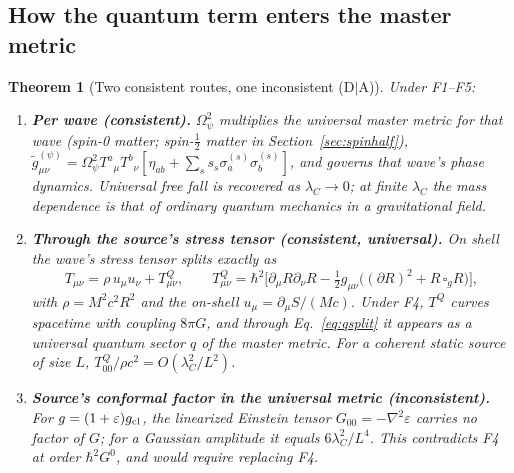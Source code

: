 \documentclass[11pt,a4paper]{article}
\newtheorem{theorem}{Theorem}[section]
\begin{document}
\subsection{How the quantum term enters the master metric}
\begin{theorem}[Two consistent routes, one inconsistent (D$\mid$A)]\label{thm:routes}
Under F1--F5:
\begin{enumerate}
\item \textbf{Per wave (consistent).} $\Omega_\psi^2$ multiplies the universal
master metric for that wave (spin-0 matter; spin-$\frac12$ matter in
Section~\ref{sec:spinhalf}),
$\tilde g^{(\psi)}_{\mu\nu}=\Omega_\psi^2T^a{}_\mu T^b{}_\nu[\eta_{ab}+\sum_ss_s\sigma^{(s)}_a\sigma^{(s)}_b]$,
and governs that wave's phase dynamics. Universal free fall is recovered as
$\lambda_C\to0$; at finite $\lambda_C$ the mass dependence is that of ordinary
quantum mechanics in a gravitational field.
\item \textbf{Through the source's stress tensor (consistent, universal).} On
shell the wave's stress tensor splits exactly as
\begin{equation}\label{eq:TQ}
T_{\mu\nu}=\rho\,u_\mu u_\nu+T^Q_{\mu\nu},\qquad
T^Q_{\mu\nu}=\hbar^2\bigl[\partial_\mu R\partial_\nu R-\tfrac12g_{\mu\nu}\bigl((\partial R)^2+R\,\square_gR\bigr)\bigr],
\end{equation}
with $\rho=M^2c^2R^2$ and the on-shell $u_\mu=\partial_\mu S/(Mc)$. Under F4, $T^Q$
curves spacetime with coupling $8\pi G$, and through Eq.~\eqref{eq:qsplit} it
appears as a universal quantum sector $q$ of the master metric. For a coherent
static source of size $L$, $T^Q_{00}/\rho c^2=O(\lambda_C^2/L^2)$.
\item \textbf{Source's conformal factor in the universal metric (inconsistent).}
For $g=(1+\varepsilon)g_{\rm cl}$, the linearized Einstein tensor
$G_{00}=-\nabla^2\varepsilon$ carries no factor of $G$; for a Gaussian amplitude it
equals $6\lambda_C^2/L^4$. This contradicts F4 at order $\hbar^2G^0$, and would
require replacing F4.
\end{enumerate}
\end{theorem}
\end{document}
